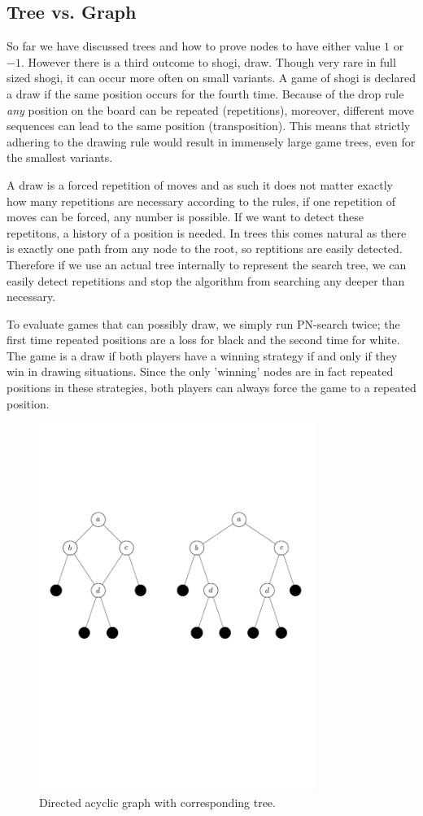 \documentclass[a4paper, 11pt]{article}
\begin{document}
\subsection{Tree vs. Graph}
\label{sec:treegraph}
So far we have discussed trees and how to prove nodes to have either value $1$ or $-1$. However there is a third outcome to shogi, draw. Though
very rare in full sized shogi, it can occur more often on small variants. A game of shogi is declared a draw if the same position occurs
for the fourth time. Because of the drop rule \textit{any} position on the board can be repeated (repetitions), moreover, different move
sequences can lead to the same position (transposition). This means that strictly adhering to the drawing rule would result in immensely large game trees,
even for the smallest variants.

A draw is a forced repetition of moves and as such it does not matter exactly how many repetitions are necessary according to the rules,
if one repetition of moves can be forced, any number is possible. If we want to detect these repetitons, a history of a position is needed. In trees this
comes natural as there is exactly one path from any node to the root, so reptitions are easily detected. Therefore if we use an actual tree internally
to represent the search tree, we can easily detect repetitions and stop the algorithm from searching any deeper than necessary.

To evaluate games that can possibly draw, we simply run PN-search twice; the first time repeated positions are a loss for black and the second time for white.
The game is a draw if both players have a winning strategy if
and only if they win in drawing situations. Since the only 'winning' nodes are in fact repeated positions in these strategies, both players can always
force the game to a repeated position.

\begin{figure}[h]
\center
\includegraphics[trim = 0mm 10cm 0cm 0cm, clip, width=9cm]{treevsgraph.pdf}
\caption{Directed acyclic graph with corresponding tree.}
\label{treevsgraph}
\end{figure}
\end{document}
